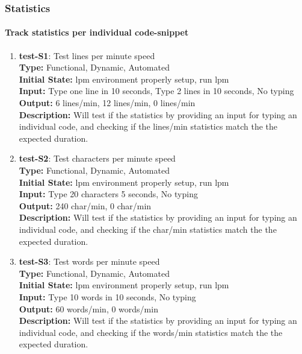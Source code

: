 \documentclass[12pt, titlepage]{article}
\begin{document}
\subsubsection{Statistics}

\paragraph{Track statistics per individual code-snippet}
\begin{enumerate}
\item{\textbf{test-S1}: Test lines per minute speed\\}
\textbf{Type:} Functional, Dynamic, Automated \\
\textbf{Initial State:} lpm environment properly setup, run lpm\\
\textbf{Input:} Type one line in 10 seconds, Type 2 lines in 10 seconds, No typing\\
\textbf{Output:} 6 lines/min, 12 lines/min, 0 lines/min \\
\textbf{Description:} Will test if the statistics by providing an input for typing an individual code, and checking if the lines/min statistics match the the expected duration.\\

\item{\textbf{test-S2}: Test characters per minute speed \\}
\textbf{Type:} Functional, Dynamic, Automated \\
\textbf{Initial State:} lpm environment properly setup, run lpm\\
\textbf{Input:} Type 20 characters 5 seconds, No typing\\
\textbf{Output:} 240 char/min, 0 char/min \\
\textbf{Description:} Will test if the statistics by providing an input for typing an individual code, and checking if the char/min statistics match the the expected duration.\\

\item{\textbf{test-S3}: Test words per minute speed\\}
\textbf{Type:} Functional, Dynamic, Automated \\
\textbf{Initial State:} lpm environment properly setup, run lpm\\
\textbf{Input:} Type 10 words in 10 seconds, No typing\\
\textbf{Output:} 60 words/min, 0 words/min \\
\textbf{Description:} Will test if the statistics by providing an input for typing an individual code, and checking if the words/min statistics match the the expected duration.\\


\end{enumerate}
\end{document}
